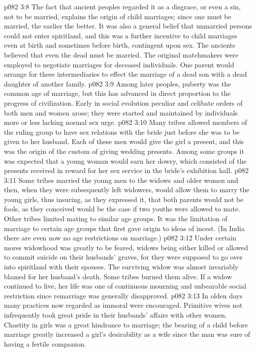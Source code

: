 \pc \vs p082 3:8 The fact that ancient peoples regarded it as a disgrace, or even a sin, not to be married, explains the origin of child marriages; since one must be married, the earlier the better. It was also a general belief that unmarried persons could not enter spiritland, and this was a further incentive to child marriages even at birth and sometimes before birth, contingent upon sex. The ancients believed that even the dead must be married. The original matchmakers were employed to negotiate marriages for deceased individuals. One parent would arrange for these intermediaries to effect the marriage of a dead son with a dead daughter of another family.
\vs p082 3:9 Among later peoples, puberty was the common age of marriage, but this has advanced in direct proportion to the progress of civilization. Early in social evolution peculiar and celibate orders of both men and women arose; they were started and maintained by individuals more or less lacking normal sex urge.
\vs p082 3:10 Many tribes allowed members of the ruling group to have sex relations with the bride just before she was to be given to her husband. Each of these men would give the girl a present, and this was the origin of the custom of giving wedding presents. Among some groups it was expected that a young woman would earn her dowry, which consisted of the presents received in reward for her sex service in the bride’s exhibition hall.
\vs p082 3:11 Some tribes married the young men to the widows and older women and then, when they were subsequently left widowers, would allow them to marry the young girls, thus insuring, as they expressed it, that both parents would not be fools, as they conceived would be the case if two youths were allowed to mate. Other tribes limited mating to similar age groups. It was the limitation of marriage to certain age groups that first gave origin to ideas of incest. (In India there are even now no age restrictions on marriage.)
\pc \vs p082 3:12 Under certain mores widowhood was greatly to be feared, widows being either killed or allowed to commit suicide on their husbands’ graves, for they were supposed to go over into spiritland with their spouses. The surviving widow was almost invariably blamed for her husband’s death. Some tribes burned them alive. If a widow continued to live, her life was one of continuous mourning and unbearable social restriction since remarriage was generally disapproved.
\vs p082 3:13 In olden days many practices now regarded as immoral were encouraged. Primitive wives not infrequently took great pride in their husbands’ affairs with other women. Chastity in girls was a great hindrance to marriage; the bearing of a child before marriage greatly increased a girl’s desirability as a wife since the man was sure of having a fertile companion.
